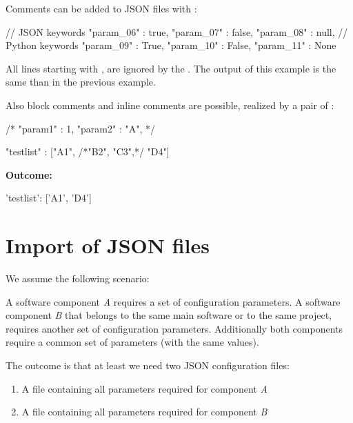 Comments can be added to JSON files with \pcode{//}:

\begin{pythoncode}
{
   // JSON keywords
   "param_06" : true,
   "param_07" : false,
   "param_08" : null,
   // Python keywords
   "param_09" : True,
   "param_10" : False,
   "param_11" : None
}
\end{pythoncode}

All lines starting with \pcode{//}, are ignored by the \pkg. The output of this example is the same than in the previous example.

\vspace{2ex}

Also block comments and inline comments are possible, realized by a pair of \pcode{/* */}:

\begin{pythoncode}
{
   /*
   "param1" : 1,
   "param2" : "A",
   */

   "testlist" : ["A1", /*"B2", "C3",*/ "D4"]
}
\end{pythoncode}

\vspace{2ex}

\textbf{Outcome:}

\begin{pythonlog}
{'testlist': ['A1', 'D4']}
\end{pythonlog}


\newpage

\section{Import of JSON files}

We assume the following scenario:

A software component \textit{A} requires a set of configuration parameters. A software component \textit{B} that belongs to the same
main software or to the same project, requires another set of configuration parameters. Additionally both components
require a common set of parameters (with the same values).

The outcome is that at least we need two JSON configuration files:

\begin{enumerate}
   \item A file  containing all parameters required for component \textit{A}
   \item A file  containing all parameters required for component \textit{B}
\end{enumerate}

